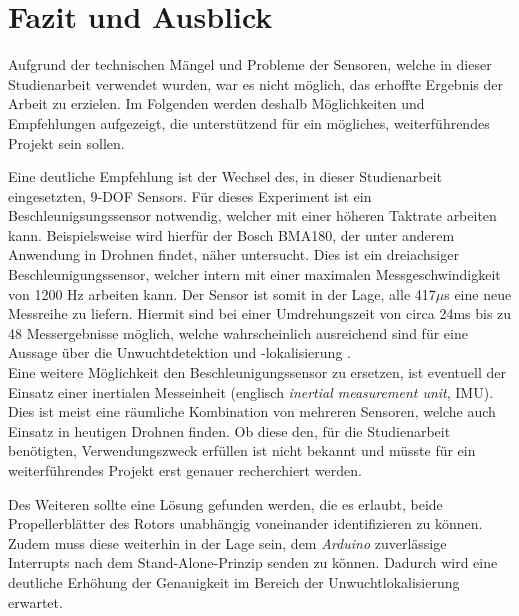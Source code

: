
\chapter{Fazit und Ausblick}
Aufgrund der technischen Mängel und Probleme der Sensoren, welche in dieser Studienarbeit verwendet wurden, war es nicht möglich, das erhoffte Ergebnis der Arbeit zu erzielen.
Im Folgenden werden deshalb Möglichkeiten und Empfehlungen aufgezeigt, die unterstützend für ein mögliches, weiterführendes Projekt sein sollen.

Eine deutliche Empfehlung ist der Wechsel des, in dieser Studienarbeit eingesetzten, \ac{9-DOF} Sensors.
Für dieses Experiment ist ein Beschleunigsungssensor notwendig, welcher mit einer höheren Taktrate arbeiten kann.
Beispielsweise wird hierfür der Bosch BMA180, der unter anderem Anwendung in Drohnen findet, näher untersucht.
Dies ist ein dreiachsiger Beschleunigungssensor, welcher intern mit einer maximalen Messgeschwindigkeit von 1200 \ac{Hz} arbeiten kann.
Der Sensor ist somit in der Lage, alle 417$\mu$s eine neue Messreihe zu liefern.
Hiermit sind bei einer Umdrehungszeit von circa 24ms bis zu 48 Messergebnisse möglich, welche wahrscheinlich ausreichend sind für eine Aussage über die Unwuchtdetektion und -lokalisierung \cite{bosch_bma180}. \\
Eine weitere Möglichkeit den Beschleunigungssensor zu ersetzen, ist eventuell der Einsatz einer inertialen Messeinheit (englisch \textit{inertial measurement unit}, IMU).
Dies ist meist eine räumliche Kombination von mehreren Sensoren, welche auch Einsatz in heutigen Drohnen finden.
Ob diese den, für die Studienarbeit benötigten, Verwendungszweck erfüllen ist nicht bekannt und müsste für ein weiterführendes Projekt erst genauer recherchiert werden.

Des Weiteren sollte eine Lösung gefunden werden, die es erlaubt, beide Propellerblätter des Rotors unabhängig voneinander identifizieren zu können.
Zudem muss diese weiterhin in der Lage sein, dem \emph{Arduino} zuverlässige Interrupts nach dem Stand-Alone-Prinzip senden zu können.
Dadurch wird eine deutliche Erhöhung der Genauigkeit im Bereich der Unwuchtlokalisierung erwartet.
